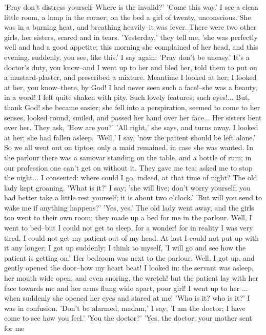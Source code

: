'Pray don't distress yourself--Where is the invalid?' 'Come this way.'
I see a clean little room, a lamp in the corner; on the bed a girl of
twenty, unconscious. She was in a burning heat, and breathing
heavily--it was fever. There were two other girls, her sisters, scared
and in tears. 'Yesterday,' they tell me, 'she was perfectly well and
had a good appetite; this morning she complained of her head, and this
evening, suddenly, you see, like this.' I say again: 'Pray don't be
uneasy.' It's a doctor's duty, you know--and I went up to her and bled
her, told them to put on a mustard-plaster, and prescribed a mixture.
Meantime I looked at her; I looked at her, you know--there, by God! I
had never seen such a face!--she was a beauty, in a word! I felt quite
shaken with pity. Such lovely features; such eyes!... But, thank God!
she became easier; she fell into a perspiration, seemed to come to her
senses, looked round, smiled, and passed her hand over her face... Her
sisters bent over her. They ask, 'How are you?' 'All right,' she says,
and turns away. I looked at her; she had fallen asleep. 'Well,' I say,
'now the patient should be left alone.' So we all went out on tiptoe;
only a maid remained, in case she was wanted. In the parlour there was
a samovar standing on the table, and a bottle of rum; in our
profession one can't get on without it. They gave me tea; asked me to
stop the night... I consented: where could I go, indeed, at that time
of night? The old lady kept groaning. 'What is it?' I say; 'she will
live; don't worry yourself; you had better take a little rest
yourself; it is about two o'clock.' 'But will you send to wake me if
anything happens?' 'Yes, yes.' The old lady went away, and the girls
too went to their own room; they made up a bed for me in the parlour.
Well, I went to bed--but I could not get to sleep, for a wonder! for
in reality I was very tired. I could not get my patient out of my
head. At last I could not put up with it any longer; I got up
suddenly; I think to myself, 'I will go and see how the patient is
getting on.' Her bedroom was next to the parlour. Well, I got up, and
gently opened the door--how my heart beat! I looked in: the servant
was asleep, her mouth wide open, and even snoring, the wretch! but the
patient lay with her face towards me and her arms flung wide apart,
poor girl! I went up to her ... when suddenly she opened her eyes and
stared at me! 'Who is it? who is it?' I was in confusion. 'Don't be
alarmed, madam,' I say; 'I am the doctor; I have come to see how you
feel.' 'You the doctor?' 'Yes, the doctor; your mother sent for me
